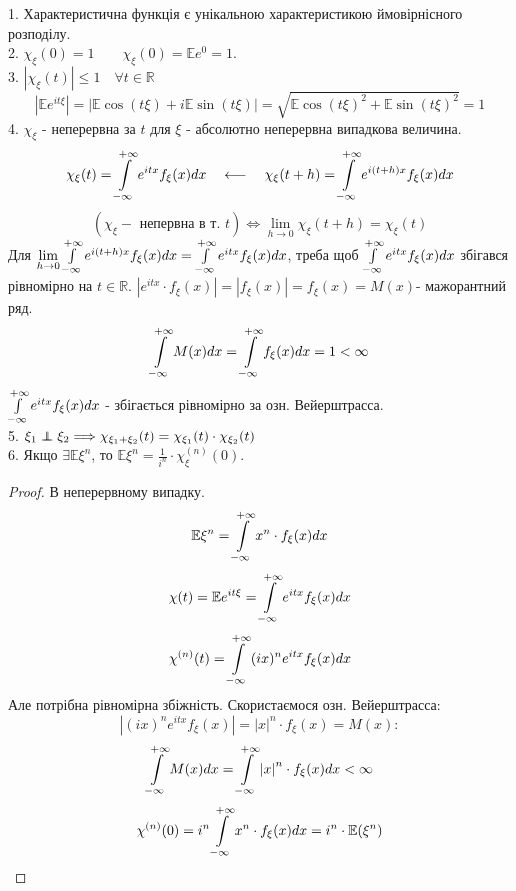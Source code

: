 1. Характеристична функція є унікальною характеристикою ймовірнісного розподілу.\\
2. $ \chi_{\xi} (0) = 1  \qquad \chi_{\xi} (0) =  \mathbb{E} e^0 = 1$.\\
3. $	\left| \chi_ \xi (t)\right| \leq 1 \quad \forall t \in \mathbb{R}$
$$
\left| \mathbb{E} e^{it \xi} \right| = \left| \mathbb{E}\cos{(t \xi)} + i \mathbb{E} \sin{(t \xi)}   \right| = \sqrt{
\mathbb{E} \cos{(t \xi)}^2 + \mathbb{E} \sin{(t \xi)}^2
}  = 1
$$
4. $\chi_ \xi$ - неперервна за $t$ для $\xi$ - абсолютно неперервна випадкова величина.
$$
\chi_ {\xi} (t) =  \int\limits_{-\infty}^{ +\infty}{ e^{itx} f_{\xi} (x) dx}
\quad \longleftarrow \quad
\chi_ {\xi} (t+h) =  \int\limits_{-\infty}^{ +\infty}{ e^{i(t+h)x} f_{\xi} (x) dx}
$$
$$
(\chi_{\xi} - \text{ непервна в т. } t ) \Longleftrightarrow  \lim\limits_{h\to0}{ \chi_ \xi (t+h) } = \chi_{\xi} (t)
$$
Для $
 \lim\limits_{h\to  0}{  \int\limits_{-\infty}^{ +\infty}{ e^{i(t+h)x} f_{\xi}(x)}dx} =  \int\limits_{-\infty}^{ +\infty}{ e^{itx} f_ \xi(x) dx}
$, треба щоб $  \int\limits_{ -\infty}^{ +\infty}{e^{itx}f_ \xi (x)dx}$ збігався рівномірно на $t \in \mathbb{R}$. $ \left| e^{itx} \cdot f_{\xi}(x) \right| = \left| f_{\xi}(x) \right| = f_{\xi}(x) = M(x) $- мажорантний ряд.\\
$$
 \int\limits_{-\infty}^{ +\infty}{ M(x) dx } =  \int\limits_{-\infty}^{ +\infty}{f_{\xi}(x)dx } = 1 < \infty
$$
$
 \int\limits_{-\infty}^{ +\infty}{ e^{itx} f_{\xi} (x) dx }
$ - збігається рівномірно за озн. Вейерштрасса.\\
5. $ \xi_1 \independent \xi_2 \Longrightarrow \chi_{\xi_1 + \xi_2} (t) = \chi_ {\xi_1} (t) \cdot  \chi_ {\xi_2} (t) $\\
6. Якщо $ \exists \mathbb{E} \xi^n$, то $\mathbb{E} \xi^n = \frac{1}{i^n}\cdot \chi^{(n)}_ \xi (0) $.
\begin{proof} В неперервному випадку.
$$
\mathbb{E} \xi^n =  \int\limits_{-\infty}^{ +\infty}{x^n \cdot f_ {\xi} (x)dx}
$$
$$
\chi (t) = \mathbb{E} e^{it \xi} =  \int\limits_{-\infty}^{ +\infty}{ e^{itx} f_ \xi(x) dx}
$$
$$
\chi^{(n)}(t) =  \int\limits_{-\infty}^{ +\infty}{ (ix)^n e^{itx} f_ \xi  (x) dx}
$$
Але потрібна рівномірна збіжність. Скористаємося озн. Вейерштрасса:
$$
\left| (ix)^n e^{itx} f_ \xi  (x)  \right| = \left| x \right|^n \cdot f_ \xi (x) = M(x):
$$
$$
 \int\limits_{-\infty}^{ +\infty}{ M(x)dx} =  \int\limits_{-\infty}^{ +\infty}{ \left| x \right|^n \cdot f_{\xi}(x)dx < \infty }
$$
$$
\chi^{(n)}(0) = i^n  \int\limits_{-\infty}^{ +\infty}{ x^n \cdot f_{\xi} (x)dx} = i^n \cdot \mathbb{E}(\xi^n)
$$
\end{proof}
